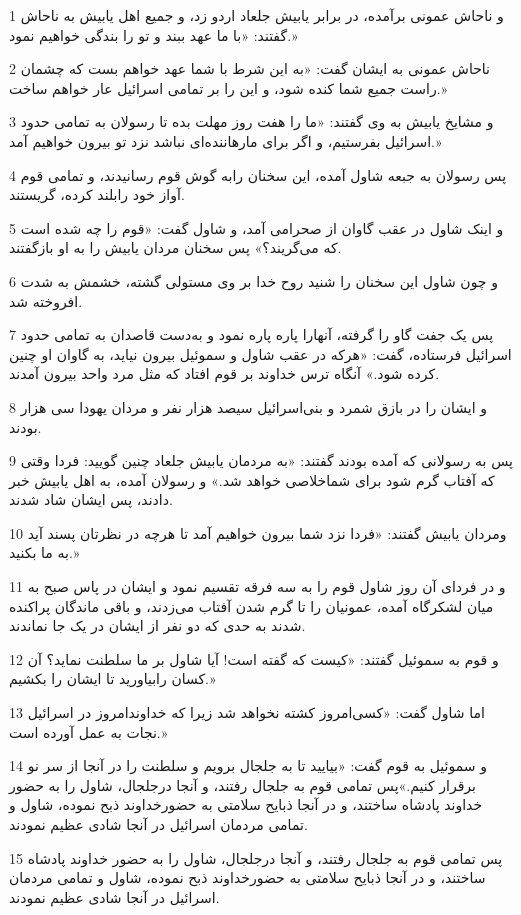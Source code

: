 \par 1 و ناحاش عمونی برآمده، در برابر یابیش جلعاد اردو زد، و جمیع اهل یابیش به ناحاش گفتند: «با ما عهد ببند و تو را بندگی خواهیم نمود.»
\par 2 ناحاش عمونی به ایشان گفت: «به این شرط با شما عهد خواهم بست که چشمان راست جمیع شما کنده شود، و این را بر تمامی اسرائیل عار خواهم ساخت.»
\par 3 و مشایخ یابیش به وی گفتند: «ما را هفت روز مهلت بده تا رسولان به تمامی حدود اسرائیل بفرستیم، و اگر برای مارهاننده‌ای نباشد نزد تو بیرون خواهیم آمد.»
\par 4 پس رسولان به جبعه شاول آمده، این سخنان رابه گوش قوم رسانیدند، و تمامی قوم آواز خود رابلند کرده، گریستند.
\par 5 و اینک شاول در عقب گاوان از صحرامی آمد، و شاول گفت: «قوم را چه شده است که می‌گریند؟» پس سخنان مردان یابیش را به او بازگفتند.
\par 6 و چون شاول این سخنان را شنید روح خدا بر وی مستولی گشته، خشمش به شدت افروخته شد.
\par 7 پس یک جفت گاو را گرفته، آنهارا پاره پاره نمود و به‌دست قاصدان به تمامی حدود اسرائیل فرستاده، گفت: «هر‌که در عقب شاول و سموئیل بیرون نیاید، به گاوان او چنین کرده شود.» آنگاه ترس خداوند بر قوم افتاد که مثل مرد واحد بیرون آمدند.
\par 8 و ایشان را در بازق شمرد و بنی‌اسرائیل سیصد هزار نفر و مردان یهودا سی هزار بودند.
\par 9 پس به رسولانی که آمده بودند گفتند: «به مردمان یابیش جلعاد چنین گویید: فردا وقتی که آفتاب گرم شود برای شماخلاصی خواهد شد.» و رسولان آمده، به اهل یابیش خبر دادند، پس ایشان شاد شدند.
\par 10 ومردان یابیش گفتند: «فردا نزد شما بیرون خواهیم آمد تا هرچه در نظرتان پسند آید به ما بکنید.»
\par 11 و در فردای آن روز شاول قوم را به سه فرقه تقسیم نمود و ایشان در پاس صبح به میان لشکرگاه آمده، عمونیان را تا گرم شدن آفتاب می‌زدند، و باقی ماندگان پراکنده شدند به حدی که دو نفر از ایشان در یک جا نماندند.
\par 12 و قوم به سموئیل گفتند: «کیست که گفته است! آیا شاول بر ما سلطنت نماید؟ آن کسان رابیاورید تا ایشان را بکشیم.»
\par 13 اما شاول گفت: «کسی‌امروز کشته نخواهد شد زیرا که خداوندامروز در اسرائیل نجات به عمل آورده است.»
\par 14 و سموئیل به قوم گفت: «بیایید تا به جلجال برویم و سلطنت را در آنجا از سر نو برقرار کنیم.»پس تمامی قوم به جلجال رفتند، و آنجا درجلجال، شاول را به حضور خداوند پادشاه ساختند، و در آنجا ذبایح سلامتی به حضورخداوند ذبح نموده، شاول و تمامی مردمان اسرائیل در آنجا شادی عظیم نمودند.
\par 15 پس تمامی قوم به جلجال رفتند، و آنجا درجلجال، شاول را به حضور خداوند پادشاه ساختند، و در آنجا ذبایح سلامتی به حضورخداوند ذبح نموده، شاول و تمامی مردمان اسرائیل در آنجا شادی عظیم نمودند.
 
